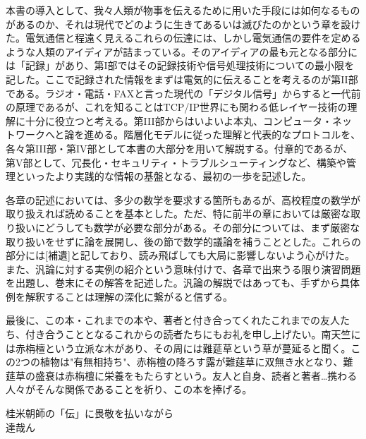 本書の導入として、我々人類が物事を伝えるために用いた手段には如何なるものがあるのか、それは現代でどのように生きてあるいは滅びたのかという章を設けた。電気通信と程遠く見えるこれらの伝達には、しかし電気通信の要件を定めるような人類のアイディアが詰まっている。そのアイディアの最も元となる部分には「記録」があり、第I部ではその記録技術や信号処理技術についての最小限を記した。ここで記録された情報をまずは電気的に伝えることを考えるのが第II部である。ラジオ・電話・FAXと言った現代の「デジタル信号」からすると一代前の原理であるが、これを知ることはTCP/IP世界にも関わる低レイヤー技術の理解に十分に役立つと考える。第III部からはいよいよ本丸、コンピュータ・ネットワークへと論を進める。階層化モデルに従った理解と代表的なプロトコルを、各々第III部・第IV部として本書の大部分を用いて解説する。付章的であるが、第V部として、冗長化・セキュリティ・トラブルシューティングなど、構築や管理といったより実践的な情報の基盤となる、最初の一歩を記述した。

各章の記述においては、多少の数学を要求する箇所もあるが、高校程度の数学が取り扱えれば読めることを基本とした。ただ、特に前半の章においては厳密な取り扱いにどうしても数学が必要な部分がある。その部分については、まず厳密な取り扱いをせずに論を展開し、後の節で数学的議論を補うこととした。これらの部分には[補遺]と記しており、読み飛ばしても大局に影響しないよう心がけた。また、汎論に対する実例の紹介という意味付けで、各章で出来うる限り演習問題を出題し、巻末にその解答を記述した。汎論の解説ではあっても、手ずから具体例を解釈することは理解の深化に繋がると信ずる。

最後に、この本・これまでの本や、著者と付き合ってくれたこれまでの友人たち、付き合うこととなるこれからの読者たちにもお礼を申し上げたい。南天竺には赤栴檀という立派な木があり、その周には難莚草という草が蔓延ると聞く。この2つの植物は"有無相持ち"、赤栴檀の降ろす露が難莚草に双無き水となり、難莚草の盛衰は赤栴檀に栄養をもたらすという。友人と自身、読者と著者…携わる人々がそんな関係であることを祈り、この本を捧げる。

\begin{flushright}
桂米朝師の「伝」に畏敬を払いながら \\
達哉ん
\end{flushright}

